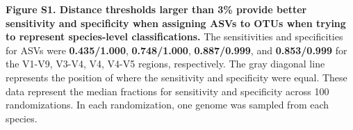 \documentclass[
]{article}
\begin{document}
\textbf{Figure S1. Distance thresholds larger than 3\% provide better
sensitivity and specificity when assigning ASVs to OTUs when trying to
represent species-level classifications.} The sensitivities and
specificities for ASVs were \textbf{0.435/1.000}, \textbf{0.748/1.000},
\textbf{0.887/0.999}, and \textbf{0.853/0.999} for the V1-V9, V3-V4, V4,
V4-V5 regions, respectively. The gray diagonal line represents the
position of where the sensitivity and specificity were equal. These data
represent the median fractions for sensitivity and specificity across
100 randomizations. In each randomization, one genome was sampled from
each species.
\end{document}
